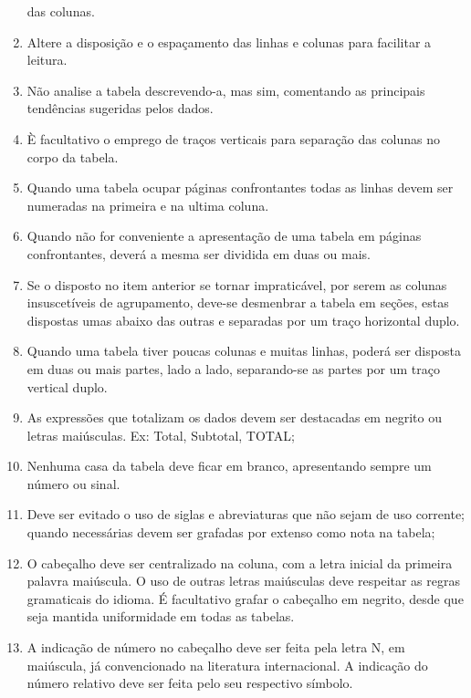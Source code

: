 \begin{enumerate}
das colunas. 
\item Altere a disposição e o espaçamento das linhas
e colunas para facilitar a leitura. 
\item Não analise a tabela
descrevendo-a, mas sim, comentando as principais tendências
sugeridas pelos dados. 
\item È facultativo o emprego de traços
verticais para separação das colunas no corpo da tabela. 
\item Quando
uma tabela ocupar páginas confrontantes todas as linhas devem ser
numeradas na primeira e na ultima coluna. 
\item Quando não for
conveniente a apresentação de uma tabela em páginas confrontantes,
deverá a mesma ser dividida em duas ou mais. 
\item Se o disposto
no item anterior se tornar impraticável, por serem as colunas
insuscetíveis de agrupamento, deve-se desmenbrar a tabela em
seções, estas dispostas umas abaixo das outras e separadas por um traço horizontal duplo. 
\item Quando uma tabela tiver poucas
colunas e muitas linhas, poderá ser disposta em duas ou mais
partes, lado a lado, separando-se as partes por um traço vertical
duplo.
\item As expressões que totalizam os dados devem ser destacadas em negrito ou letras maiúsculas. Ex: Total, Subtotal, TOTAL;
\item Nenhuma casa da tabela deve ficar em branco, apresentando sempre um número ou sinal.
\item Deve ser evitado o uso de siglas e abreviaturas que não sejam de uso corrente; quando necessárias devem ser grafadas por extenso como nota na tabela;
\item O cabeçalho deve ser centralizado na coluna, com a letra inicial da primeira palavra maiúscula. O uso de outras letras maiúsculas deve respeitar as regras gramaticais do idioma. É facultativo grafar o cabeçalho em negrito, desde que seja mantida uniformidade em todas as tabelas.
\item A indicação de número no cabeçalho deve ser feita pela letra N, em maiúscula, já convencionado na literatura internacional. A indicação do número relativo deve ser feita pelo seu respectivo símbolo.
\end{enumerate}






